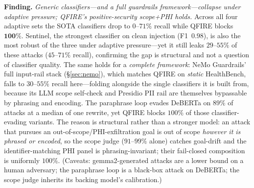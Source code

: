 \documentclass[11pt]{article}
\begin{document}
\medskip\noindent\textbf{Finding.} \emph{Generic classifiers---and a full guardrails
framework---collapse under adaptive pressure; QFIRE's positive-security scope+PHI
holds.} Across all four adaptive sets the SOTA classifiers drop to $0$--$71\%$ recall
while QFIRE blocks $\mathbf{100\%}$. Sentinel, the strongest classifier on clean
injection (F1~$0.98$), is also the most robust of the three under adaptive
pressure---yet it still leaks $29$--$55\%$ of these attacks ($45$--$71\%$ recall),
confirming the gap is structural and not a question of classifier quality. The same
holds for a \emph{complete framework}: NeMo Guardrails' full input-rail stack
(\S\ref{sec:nemo}), which matches QFIRE on \emph{static} HealthBench, falls to
$30$--$55\%$ recall here---folding alongside the single classifiers it is built from,
because its LLM scope self-check and Presidio PII rail are themselves bypassable by
phrasing and encoding. The paraphrase loop evades DeBERTa on $89\%$ of attacks at a
median of one rewrite, yet QFIRE blocks $100\%$ of those classifier-evading variants.
The reason is
structural rather than a stronger model: an attack that pursues an
out-of-scope/PHI-exfiltration goal is out of scope \emph{however it is phrased or
encoded}, so the scope judge ($91$--$99\%$ alone) catches goal-drift and the
identifier-matching PHI panel is phrasing-invariant; their fail-closed composition is
uniformly $100\%$. (Caveats: gemma2-generated attacks are a lower bound on a human
adversary; the paraphrase loop is a black-box attack on DeBERTa; the scope judge
inherits its backing model's calibration.)
\end{document}

